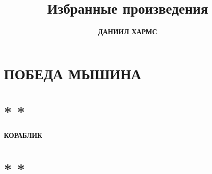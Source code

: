 \documentclass[a4paper, 12pt, oneside]{book}
\title{\fontsize{36pt}{44pt}\selectfont\bfseries Избранные произведения}
\author{\Huge\bfseries ДАНИИЛ ХАРМС}
\date{}
\begin{document}
\maketitle

\chapter*{ПОБЕДА МЫШИНА}


\chapter*{\fontsize{12pt}{14pt}\selectfont\normalfont * * *}
\begin{center}
\vspace*{-5ex}
\large\bfseries КОРАБЛИК
\vspace{2ex}
\end{center}


\chapter*{\fontsize{12pt}{14pt}\selectfont\normalfont * * *}

\end{document}
